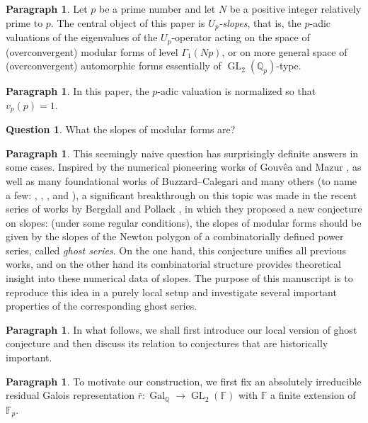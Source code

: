 \documentclass[12pt]{amsart}
\theoremstyle{definition}
\newtheorem{question}[subsection]{Question}
\newtheorem{para}[subsection]{Paragraph}
\numberwithin{equation}{subsection}
\def\FF{\mathbb{F}}
\def\QQ{\mathbb{Q}}
\DeclareMathOperator{\Gal}{Gal}
\DeclareMathOperator{\GL}{GL}
\begin{document}
\begin{para}
\label{P:para_001}
Let $p$ be a prime number and let $N$ be a positive integer relatively prime to $p$. The central object of this paper is \emph{$U_p$-slopes}, that is, the $p$-adic valuations of the eigenvalues of the $U_p$-operator acting on the space of (overconvergent) modular forms of level $\Gamma_1(Np)$, or on more general space of (overconvergent) automorphic forms essentially of $\GL_2(\QQ_p)$-type.
\end{para}
\begin{para}
\label{P:para_002}
In this paper, the $p$-adic valuation is normalized so that $v_p(p) =1$.
\end{para}
\begin{question}
What the slopes of modular forms are?
\end{question}
\begin{para}
\label{P:para_003}
This seemingly naive question has surprisingly definite answers in some cases.
Inspired by the numerical pioneering works of Gouv\^ea and Mazur \cite{gouvea-mazur, gouvea}, as well as many foundational works of Buzzard--Calegari and many others (to name a few: \cite{buzzard-calegari}, \cite{buzzard-slope}, \cite{clay}, and  \cite{loeffler-slope}), a significant breakthrough on this topic was made in the recent series of works by Bergdall and Pollack \cite{bergdall-pollack2, bergdall-pollack3}, in which they proposed a new
conjecture on slopes: (under some regular conditions), the slopes of modular forms should be given by the slopes of the Newton polygon of a combinatorially defined power series, called \emph{ghost series}. On the one hand, this conjecture unifies all previous works, and on the other hand its combinatorial structure provides theoretical insight into these numerical data of slopes. The purpose of this manuscript is to reproduce this idea in a purely local setup and investigate several important properties of the corresponding ghost series.
\end{para}

\begin{para}
\label{P:para_004}
In what follows, we shall first introduce our local version of ghost conjecture and then discuss its relation to conjectures that are historically important.
\end{para}

\begin{para}
\label{P:para_005}
To motivate our construction, we first fix an absolutely irreducible residual Galois representation $\bar r: \Gal_\QQ\to \GL_2(\FF)$ with $\FF$ a finite extension of $\FF_p$.
\end{para}
\end{document}
